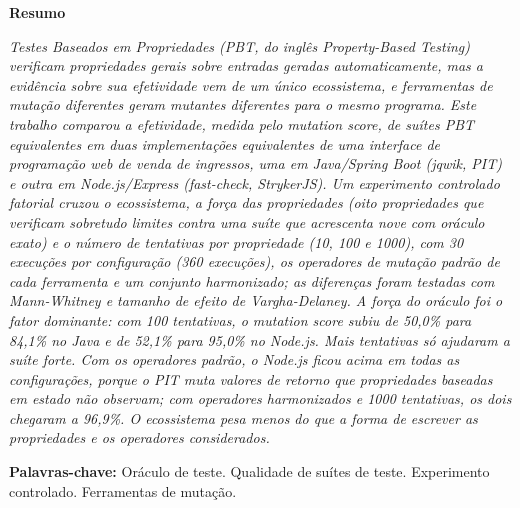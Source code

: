 \begin{center}\textbf{Resumo}\end{center}
\vspace{-6pt}
{\small\noindent\itshape
Testes Baseados em Propriedades (PBT, do inglês \textup{Property-Based Testing}) verificam propriedades gerais sobre entradas geradas automaticamente, mas a evidência sobre sua efetividade vem de um único ecossistema, e ferramentas de mutação diferentes geram mutantes diferentes para o mesmo programa. Este trabalho comparou a efetividade, medida pelo \textup{mutation score}, de suítes PBT equivalentes em duas implementações equivalentes de uma interface de programação web de venda de ingressos, uma em Java/Spring Boot (jqwik, PIT) e outra em Node.js/Express (fast-check, StrykerJS). Um experimento controlado fatorial cruzou o ecossistema, a força das propriedades (oito propriedades que verificam sobretudo limites contra uma suíte que acrescenta nove com oráculo exato) e o número de tentativas por propriedade (10, 100 e 1000), com 30 execuções por configuração (360 execuções), os operadores de mutação padrão de cada ferramenta e um conjunto harmonizado; as diferenças foram testadas com Mann-Whitney e tamanho de efeito de Vargha-Delaney. A força do oráculo foi o fator dominante: com 100 tentativas, o \textup{mutation score} subiu de 50,0\% para 84,1\% no Java e de 52,1\% para 95,0\% no Node.js. Mais tentativas só ajudaram a suíte forte. Com os operadores padrão, o Node.js ficou acima em todas as configurações, porque o PIT muta valores de retorno que propriedades baseadas em estado não observam; com operadores harmonizados e 1000 tentativas, os dois chegaram a 96,9\%. O ecossistema pesa menos do que a forma de escrever as propriedades e os operadores considerados.

\noindent\textbf{Palavras-chave:} Oráculo de teste. Qualidade de suítes de teste. Experimento controlado. Ferramentas de mutação.\par}
